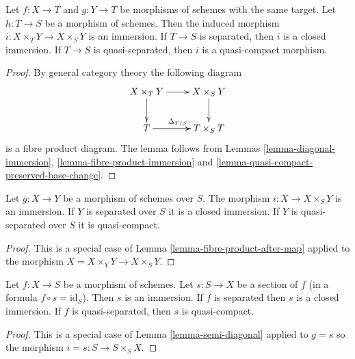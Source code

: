 \begin{lemma}
\label{lemma-fibre-product-after-map}
Let $f : X \to T$ and $g : Y \to T$ be morphisms of schemes
with the same target. Let $h : T \to S$ be a morphism of schemes.
Then the induced morphism $i : X \times_T Y \to X \times_S Y$ is
an immersion. If $T \to S$ is separated, then $i$ is a closed
immersion. If $T \to S$ is quasi-separated, then $i$ is a
quasi-compact morphism.
\end{lemma}

\begin{proof}
By general category theory the following diagram
$$
\xymatrix{
X \times_T Y \ar[r] \ar[d] & X \times_S Y \ar[d] \\
T \ar[r]^{\Delta_{T/S}} \ar[r] & T \times_S T
}
$$
is a fibre product diagram. The lemma follows
from Lemmas \ref{lemma-diagonal-immersion},
\ref{lemma-fibre-product-immersion} and
\ref{lemma-quasi-compact-preserved-base-change}.
\end{proof}

\begin{lemma}
\label{lemma-semi-diagonal}
\begin{reference}
\cite[Chapter II, \S 1, no. 35, p. 228]{FAC}
\end{reference}
Let $g : X \to Y$ be a morphism of schemes over $S$.
The morphism $i : X \to X \times_S Y$ is an immersion.
If $Y$ is separated over $S$ it is a closed immersion.
If $Y$ is quasi-separated over $S$ it is quasi-compact.
\end{lemma}

\begin{proof}
This is a special case of Lemma \ref{lemma-fibre-product-after-map}
applied to the morphism $X = X \times_Y Y \to X \times_S Y$.
\end{proof}

\begin{lemma}
\label{lemma-section-immersion}
Let $f : X \to S$ be a morphism of schemes.
Let $s : S \to X$ be a section of $f$ (in a formula $f \circ s = \text{id}_S$).
Then $s$ is an immersion.
If $f$ is separated then $s$ is a closed immersion.
If $f$ is quasi-separated, then $s$ is quasi-compact.
\end{lemma}

\begin{proof}
This is a special case of Lemma \ref{lemma-semi-diagonal} applied to
$g =s$ so the morphism $i = s : S \to S \times_S X$.
\end{proof}

